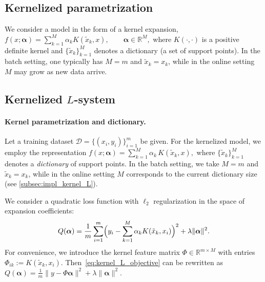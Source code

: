 \documentclass[a4paper,fleqn]{cas-sc}
\begin{document}
\subsection{Kernelized parametrization}

We consider a model in the form of a kernel expansion,
$
f(x;\boldsymbol{\alpha})
=
\sum_{k=1}^{M}\alpha_k K(\tilde{x}_k,x),
\qquad
\boldsymbol{\alpha}\in\mathbb{R}^M,
$
where $K(\cdot,\cdot)$ is a positive definite kernel
and $\{\tilde{x}_k\}_{k=1}^{M}$ denotes a dictionary
(a set of support points).
In the batch setting, one typically has $M=m$ and $\tilde{x}_k=x_k$,
while in the online setting $M$ may grow as new data arrive.


\subsection{Kernelized $L$-system}
\label{subsec:kernel_L}

\paragraph{Kernel parametrization and dictionary.}
Let a training dataset $\mathcal{D}=\{(x_i,y_i)\}_{i=1}^m$ be given.
For the kernelized model, we employ the representation
$
f(x;\boldsymbol{\alpha})=\sum_{k=1}^{M}\alpha_k\,K(\tilde{x}_k,x),
$
where $\{\tilde{x}_k\}_{k=1}^{M}$ denotes a \emph{dictionary} of support points.
In the batch setting, we take $M=m$ and $\tilde{x}_k=x_k$,
while in the online setting $M$ corresponds to the current dictionary size
(see \ref{subsec:impl_kernel_L}).

We consider a quadratic loss function with $\ell_2$ regularization
in the space of expansion coefficients:
\begin{equation}
\label{eq:kernel_L_objective}
Q(\boldsymbol{\alpha})
=
\frac{1}{m}\sum_{i=1}^{m}
\Bigl(
y_i - \sum_{k=1}^{M}\alpha_k K(\tilde{x}_k,x_i)
\Bigr)^2
+
\lambda\|\boldsymbol{\alpha}\|^2 .
\end{equation}
For convenience, we introduce the kernel feature matrix
$\Phi\in\mathbb{R}^{m\times M}$ with entries
$\Phi_{ik}:=K(\tilde{x}_k,x_i)$.
Then~\eqref{eq:kernel_L_objective} can be rewritten as
$
Q(\boldsymbol{\alpha})
=
\frac{1}{m}\|y-\Phi\boldsymbol{\alpha}\|^2+\lambda\|\boldsymbol{\alpha}\|^2 .
$
\end{document}
